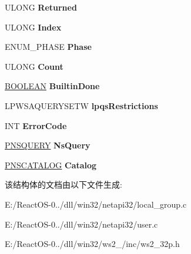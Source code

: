 \begin{DoxyCompactItemize}
U\+L\+O\+NG {\bfseries Returned}
\item 
\mbox{\label{struct___e_n_u_m___c_o_n_t_e_x_t_a0ba1d75d84798603e9b80e05e0de451c}} 
U\+L\+O\+NG {\bfseries Index}
\item 
\mbox{\label{struct___e_n_u_m___c_o_n_t_e_x_t_a56e0782dd4f98b93ea77bd392bb5ac8c}} 
E\+N\+U\+M\+\_\+\+P\+H\+A\+SE {\bfseries Phase}
\item 
\mbox{\label{struct___e_n_u_m___c_o_n_t_e_x_t_a310e7ed05631a8f183eb6e2ea3a107fe}} 
U\+L\+O\+NG {\bfseries Count}
\item 
\mbox{\label{struct___e_n_u_m___c_o_n_t_e_x_t_a3048b17d31a5044a317e6807312f734a}} 
\hyperlink{_processor_bind_8h_a112e3146cb38b6ee95e64d85842e380a}{B\+O\+O\+L\+E\+AN} {\bfseries Builtin\+Done}
\item 
\mbox{\label{struct___e_n_u_m___c_o_n_t_e_x_t_a58e4e62c14e61c5a680b917c7766c35b}} 
L\+P\+W\+S\+A\+Q\+U\+E\+R\+Y\+S\+E\+TW {\bfseries lpqs\+Restrictions}
\item 
\mbox{\label{struct___e_n_u_m___c_o_n_t_e_x_t_a255ac2202b3c2659c9fcd06490bf84f0}} 
I\+NT {\bfseries Error\+Code}
\item 
\mbox{\label{struct___e_n_u_m___c_o_n_t_e_x_t_a13b6c1c3a4a723752a901dcbd020cf25}} 
\hyperlink{struct___n_s_q_u_e_r_y}{P\+N\+S\+Q\+U\+E\+RY} {\bfseries Ns\+Query}
\item 
\mbox{\label{struct___e_n_u_m___c_o_n_t_e_x_t_a0768fe2944900854967cad723e554192}} 
\hyperlink{struct___n_s_c_a_t_a_l_o_g}{P\+N\+S\+C\+A\+T\+A\+L\+OG} {\bfseries Catalog}
\end{DoxyCompactItemize}


该结构体的文档由以下文件生成\+:\begin{DoxyCompactItemize}
\item 
E\+:/\+React\+O\+S-\/0../dll/win32/netapi32/local\+\_\+group.\+c\item 
E\+:/\+React\+O\+S-\/0../dll/win32/netapi32/user.\+c\item 
E\+:/\+React\+O\+S-\/0../dll/win32/ws2\+\_/inc/ws2\+\_\+32p.\+h\end{DoxyCompactItemize}
